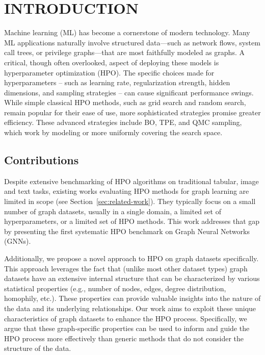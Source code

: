 \section{\uppercase{Introduction}}

Machine learning (ML) has become a cornerstone of modern technology. Many ML applications naturally involve structured data—such as network flows, system call trees, or privilege graphs—that are most faithfully modeled as graphs. A critical, though often overlooked, aspect of deploying these models is hyperparameter optimization (HPO). The specific choices made for hyperparameters -- such as learning rate, regularization strength, hidden dimensions, and sampling strategies -- can cause significant performance swings. While simple classical HPO methods, such as grid search and random search, remain popular for their ease of use, more sophisticated strategies promise greater efficiency. These advanced strategies include BO, TPE, and QMC sampling, which work by modeling or more uniformly covering the search space.

\subsection{Contributions}

Despite extensive benchmarking of HPO algorithms on traditional tabular, image and text tasks, existing works evaluating HPO methods for graph learning are limited in scope (see Section~\ref{sec:related-work}). They typically focus on a small number of graph datasets, usually in a single domain, a limited set of hyperparameters, or a limited set of HPO methods. This work addresses that gap by presenting the first systematic HPO benchmark on Graph Neural Networks (GNNs).

Additionally, we propose a novel approach to HPO on graph datasets specifically. This approach leverages the fact that (unlike most other dataset types) graph datasets have an extensive internal structure that can be characterized by various statistical properties (e.g., number of nodes, edges, degree distribution, homophily, etc.). These properties can provide valuable insights into the nature of the data and its underlying relationships. Our work aims to exploit these unique characteristics of graph datasets to enhance the HPO process. Specifically, we argue that these graph-specific properties can be used to inform and guide the HPO process more effectively than generic methods that do not consider the structure of the data.

